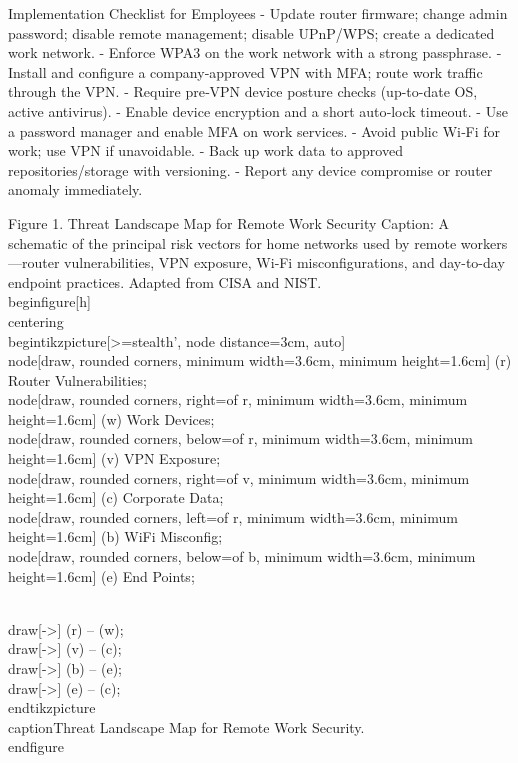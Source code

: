 \documentclass[12pt]{article}
\begin{document}
Implementation Checklist for Employees
- Update router firmware; change admin password; disable remote management; disable UPnP/WPS; create a dedicated work network.
- Enforce WPA3 on the work network with a strong passphrase.
- Install and configure a company‑approved VPN with MFA; route work traffic through the VPN.
- Require pre‑VPN device posture checks (up-to-date OS, active antivirus).
- Enable device encryption and a short auto‑lock timeout.
- Use a password manager and enable MFA on work services.
- Avoid public Wi‑Fi for work; use VPN if unavoidable.
- Back up work data to approved repositories/storage with versioning.
- Report any device compromise or router anomaly immediately.

Figure 1. Threat Landscape Map for Remote Work Security
Caption: A schematic of the principal risk vectors for home networks used by remote workers—router vulnerabilities, VPN exposure, Wi‑Fi misconfigurations, and day-to-day endpoint practices. Adapted from CISA and NIST.
\\begin{figure}[h]
\\centering
\\begin{tikzpicture}[>=stealth', node distance=3cm, auto]
\\node[draw, rounded corners, minimum width=3.6cm, minimum height=1.6cm] (r) {Router Vulnerabilities};
\\node[draw, rounded corners, right=of r, minimum width=3.6cm, minimum height=1.6cm] (w) {Work Devices};
\\node[draw, rounded corners, below=of r, minimum width=3.6cm, minimum height=1.6cm] (v) {VPN Exposure};
\\node[draw, rounded corners, right=of v, minimum width=3.6cm, minimum height=1.6cm] (c) {Corporate Data};
\\node[draw, rounded corners, left=of r, minimum width=3.6cm, minimum height=1.6cm] (b) {WiFi Misconfig};
\\node[draw, rounded corners, below=of b, minimum width=3.6cm, minimum height=1.6cm] (e) {End Points};

\\draw[->] (r) -- (w);
\\draw[->] (v) -- (c);
\\draw[->] (b) -- (e);
\\draw[->] (e) -- (c);
\\end{tikzpicture}
\\caption{Threat Landscape Map for Remote Work Security.}
\\end{figure}
\end{document}
